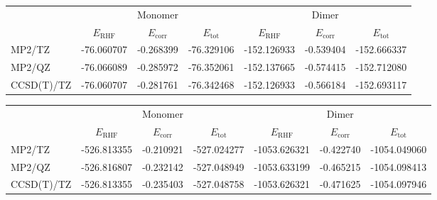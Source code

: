 \documentclass[a4paper,12pt]{scrartcl}
\begin{document}
\begin{table}
	\label{tab:mono-dim}
	\begin{subtable}[c]{1.0\textwidth}
		\centering
		\begin{tabular}{l|ccc|ccc}
			\toprule
			           &                   & Monomer            &                   &                   & Dimer              &                   \\
			           & $ E_\mathrm{RHF}$ & $ E_\mathrm{corr}$ & $ E_\mathrm{tot}$ & $ E_\mathrm{RHF}$ & $ E_\mathrm{corr}$ & $ E_\mathrm{tot}$ \\
			\midrule
			MP2/TZ     & -76.060707        & -0.268399          & -76.329106        & -152.126933       & -0.539404          & -152.666337       \\
			MP2/QZ     & -76.066089        & -0.285972          & -76.352061        & -152.137665       & -0.574415          & -152.712080       \\
			CCSD(T)/TZ & -76.060707        & -0.281761          & -76.342468        & -152.126933       & -0.566184          & -152.693117       \\
			\bottomrule
		\end{tabular}
	\end{subtable}

	\begin{subtable}[c]{1.0\textwidth}
		\centering
		\begin{adjustbox}{width=\columnwidth,center}
			\begin{tabular}{l|ccc|ccc}
				\toprule
				           &                   & Monomer            &                   &                   & Dimer              &                   \\
				           & $ E_\mathrm{RHF}$ & $ E_\mathrm{corr}$ & $ E_\mathrm{tot}$ & $ E_\mathrm{RHF}$ & $ E_\mathrm{corr}$ & $ E_\mathrm{tot}$ \\
				\midrule
				MP2/TZ     & -526.813355       & -0.210921          & -527.024277       & -1053.626321      & -0.422740          & -1054.049060      \\
				MP2/QZ     & -526.816807       & -0.232142          & -527.048949       & -1053.633199      & -0.465215          & -1054.098413      \\
				CCSD(T)/TZ & -526.813355       & -0.235403          & -527.048758       & -1053.626321      & -0.471625          & -1054.097946      \\
				\bottomrule
			\end{tabular}
		\end{adjustbox}
	\end{subtable}
\end{table}
\end{document}
